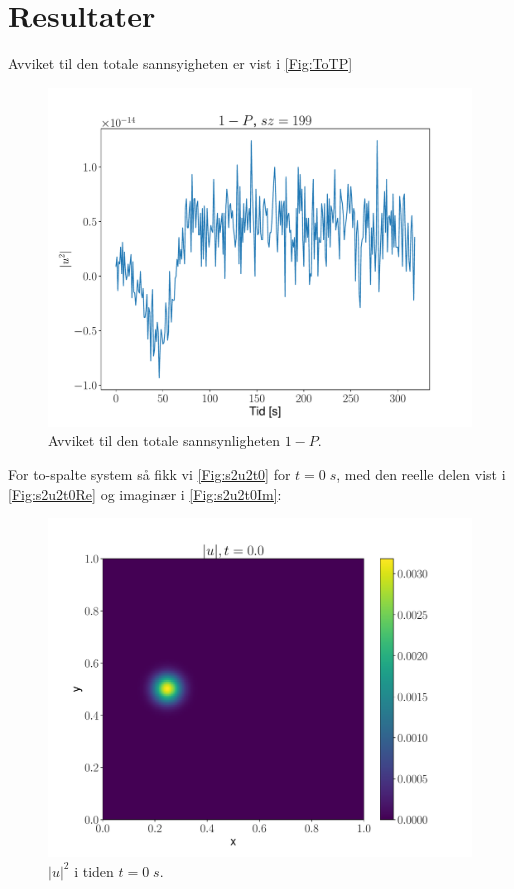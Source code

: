 \documentclass[reprint,english,notitlepage]{revtex4-2}  %
\begin{document}
\section{Resultater}

Avviket til den totale sannsyigheten er vist i \autoref{Fig:ToTP}

\begin{figure}
\centering
\includegraphics[scale=0.5]{../Images/P199.pdf}
\caption{Avviket til den totale sannsynligheten $1 - P$.}
\label{Fig:ToTP}

\end{figure}

For to-spalte system så fikk vi \autoref{Fig:s2u2t0} for $t = 0 \; s$, med den reelle delen vist i \autoref{Fig:s2u2t0Re} og imaginær i \autoref{Fig:s2u2t0Im}:

\begin{figure}[H]
\centering
\includegraphics[scale=0.45, trim={3cm 0 0 0}]{../Images/ImshowUt00sl1.pdf}
\caption{$|u|^2 $ i tiden $t = 0 \; s$.}
\label{Fig:s2u2t0}
\end{figure}
\end{document}
